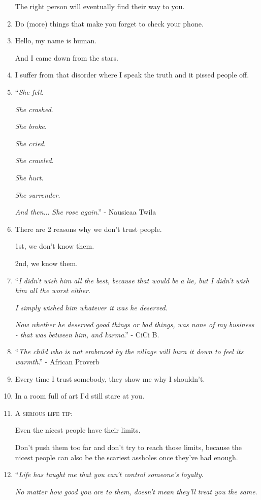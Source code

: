 \documentclass{article}
\begin{document}
\begin{enumerate}
	The right person will eventually find their way to you.
	\item Do (more) things that make you forget to check your phone.
	\item Hello, my name is human.
	
	And I came down from the stars.
	\item I suffer from that disorder where I speak the truth and it pissed people off.
	\item ``\textit{She fell}.
	
	\textit{She crashed}.
	
	\textit{She broke}.
	
	\textit{She cried}.
	
	\textit{She crawled}.
	
	\textit{She hurt}.
	
	\textit{She surrender}.
	
	\textit{And then$\ldots$ She rose again}.'' - Nausicaa Twila
	\item There are 2 reasons why we don't trust people.
	
	1st, we don't know them.
	
	2nd, we know them.
	\item ``\textit{I didn't wish him all the best, because that would be a lie, but I didn't wish him all the worst either}.
	
	\textit{I simply wished him whatever it was he deserved}.
	
	\textit{Now whether he deserved good things or bad things, was none of my business - that was between him, and karma}.'' - CiCi B.
	\item ``\textit{The child who is not embraced by the village will burn it down to feel its warmth}.'' - African Proverb
	\item Every time I trust somebody, they show me why I shouldn't.
	\item In a room full of art I'd still stare at you.
	\item \textsc{A serious life tip}:
	
	Even the nicest people have their limits.
	
	Don't push them too far and don't try to reach those limits, because the nicest people can also be the scariest assholes once they've had enough.
	\item ``\textit{Life has taught me that you can't control someone's loyalty}.
	
	\textit{No matter how good you are to them, doesn't mean they'll treat you the same}.
	

\end{enumerate}
\end{document}
